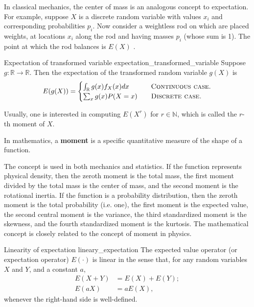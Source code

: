 In classical mechanics, the center of mass is an analogous concept to expectation. For example, suppose $X$ is a discrete random variable with values $x_i$ and corresponding probabilities $p_i$. Now consider a weightless rod on which are placed weights, at locations $x_i$ along the rod and having masses $p_i$ (whose sum is 1). The point at which the rod balances is $E(X)$ \cite{wikipedia_expected_value}.

\begin{lemma}{Expectation of transformed variable \cite{math2901_notes}}{expectation_transformed_variable}
	Suppose $g : \mathbb{R} \to \mathbb{R}$. Then the expectation of the transformed random variable $g(X)$ is
	$$
	E(g(X)) = 
		\begin{cases}
			\int_{\mathbb{R}} g(x) f_X(x) dx \quad & \text{\textsc{Continuous case.}} \\
			\sum_x g(x) P(X = x) \quad & \text{\textsc{Discrete case.}}
		\end{cases}
	$$
\end{lemma}

Usually, one is interested in computing $E(X^r)$ for $r \in \mathbb{N}$, which is called the $r$-th moment of $X$. \cite{math2901_notes}

In mathematics, a \textbf{moment} is a specific quantitative measure of the shape of a function.

The concept is used in both mechanics and statistics. If the function represents physical density, then the zeroth moment is the total mass, the first moment divided by the total mass is the center of mass, and the second moment is the rotational inertia. If the function is a probability distribution, then the zeroth moment is the total probability (i.e. one), the first moment is the expected value, the second central moment is the variance, the third standardized moment is the skewness, and the fourth standardized moment is the kurtosis. The mathematical concept is closely related to the concept of moment in physics. \cite{wikipedia_moment_mathematics}

\begin{lemma}{Linearity of expectation \cite{wikipedia_expected_value}}{lineary_expectation}
	The expected value operator (or expectation operator) $E(\cdot)$ is linear in the sense that, for any random variables $X$ and $Y$, and a constant $a$,
	\begin{align*}
		E(X + Y) &= E(X) + E(Y); \\
		E(aX) &= a E(X),
	\end{align*}
	whenever the right-hand side is well-defined.
\end{lemma}

